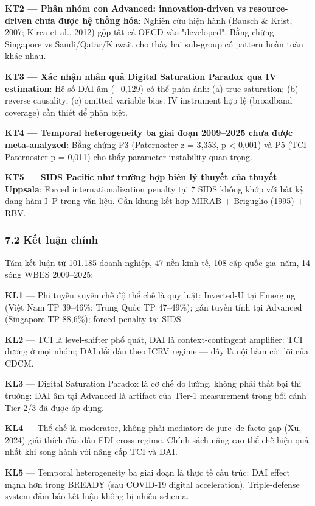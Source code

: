 \documentclass[12pt,a4paper]{article}
\begin{document}
\textbf{KT2 --- Phân nhóm con Advanced: innovation-driven vs
resource-driven chưa được hệ thống hóa}: Nghiên cứu hiện hành (Bausch \&
Krist, 2007; Kirca et al., 2012) gộp tất cả OECD vào "developed". Bằng
chứng Singapore vs Saudi/Qatar/Kuwait cho thấy hai sub-group có pattern
hoàn toàn khác nhau.

\textbf{KT3 --- Xác nhận nhân quả Digital Saturation Paradox qua IV
estimation}: Hệ số DAI âm (−0,129) có thể phản ánh: (a) true saturation;
(b) reverse causality; (c) omitted variable bias. IV instrument hợp lệ
(broadband coverage) cần thiết để phân biệt.

\textbf{KT4 --- Temporal heterogeneity ba giai đoạn 2009--2025 chưa được
meta-analyzed}: Bằng chứng P3 (Paternoster z = 3,353, p \textless{}
0,001) và P5 (TCI Paternoster p = 0,011) cho thấy parameter instability
quan trọng.

\textbf{KT5 --- SIDS Pacific như trường hợp biên lý thuyết của thuyết
Uppsala}: Forced internationalization penalty tại 7 SIDS không khớp với
bất kỳ dạng hàm I--P trong văn liệu. Cần khung kết hợp MIRAB + Briguglio
(1995) + RBV.

\hypertarget{72-kux1ebft-luux1eadn-chuxednh}{%
\subsubsection{7.2 Kết luận
chính}\label{72-kux1ebft-luux1eadn-chuxednh}}

Tám kết luận từ 101.185 doanh nghiệp, 47 nền kinh tế, 108 cặp quốc
gia--năm, 14 sóng WBES 2009--2025:

\textbf{KL1} --- Phi tuyến xuyên chế độ thể chế là quy luật: Inverted-U
tại Emerging (Việt Nam TP 39--46\%; Trung Quốc TP 47--49\%); gần tuyến
tính tại Advanced (Singapore TP 88,6\%); forced penalty tại SIDS.

\textbf{KL2} --- TCI là level-shifter phổ quát, DAI là
context-contingent amplifier: TCI dương ở mọi nhóm; DAI đổi dấu theo
ICRV regime --- đây là nội hàm cốt lõi của CDCM.

\textbf{KL3} --- Digital Saturation Paradox là cơ chế đo lường, không
phải thất bại thị trường: DAI âm tại Advanced là artifact của Tier-1
measurement trong bối cảnh Tier-2/3 đã được áp dụng.

\textbf{KL4} --- Thể chế là moderator, không phải mediator: de jure--de
facto gap (Xu, 2024) giải thích đảo dấu FDI cross-regime. Chính sách
nâng cao thể chế hiệu quả nhất khi song hành với nâng cấp TCI và DAI.

\textbf{KL5} --- Temporal heterogeneity ba giai đoạn là thực tế cấu
trúc: DAI effect mạnh hơn trong BREADY (sau COVID-19 digital
acceleration). Triple-defense system đảm bảo kết luận không bị nhiễu
schema.
\end{document}
